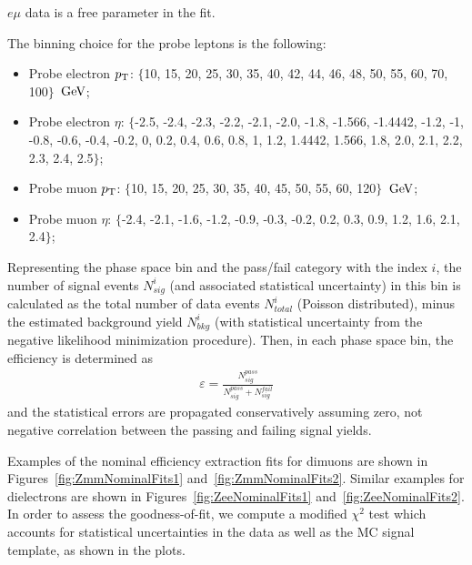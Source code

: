 {\ensuremath{e\mu} data is a free parameter in the fit.

The binning choice for the probe leptons is the following:
\begin{itemize}
\item Probe electron $p_{\mathrm{T}}$: $\{$10, 15, 20, 25, 30, 35, 40, 42, 44, 46, 48, 50, 55, 60, 70, 100$\}$ $\,\text{Ge\hspace{-.08em}V}$;
\item Probe electron $\eta$: $\{$-2.5, -2.4, -2.3, -2.2, -2.1, -2.0, -1.8, -1.566, -1.4442, -1.2, -1, -0.8, -0.6, -0.4, -0.2, 0, 0.2, 0.4, 0.6, 0.8, 1, 1.2, 1.4442, 1.566, 1.8, 2.0, 2.1, 2.2, 2.3, 2.4, 2.5$\}$;
\item Probe muon $p_{\mathrm{T}}$: $\{$10, 15, 20, 25, 30, 35, 40, 45, 50, 55, 60, 120$\}$ $\,\text{Ge\hspace{-.08em}V}$;
\item Probe muon $\eta$: $\{$-2.4, -2.1, -1.6, -1.2, -0.9, -0.3, -0.2, 0.2, 0.3, 0.9, 1.2, 1.6, 2.1, 2.4$\}$;
\end{itemize}

Representing the phase space bin and the pass/fail category with the index $i$,
the number of signal events $N_{sig}^{i}$ (and associated statistical uncertainty) in this bin
is calculated as the total number of data events $N_{total}^{i}$ (Poisson distributed),
minus the estimated background yield $N_{bkg}^{i}$
(with statistical uncertainty from the negative likelihood minimization procedure).
Then, in each phase space bin, the efficiency is determined as
\begin{align*}
  \varepsilon = \frac{N_{sig}^{pass}}{N_{sig}^{pass}+N_{sig}^{fail}}
\end{align*}
and the statistical errors are propagated conservatively assuming zero, not negative
correlation between the passing and failing signal yields.

Examples of the nominal efficiency extraction fits for dimuons are shown in Figures~\ref{fig:ZmmNominalFits1} and~\ref{fig:ZmmNominalFits2}.
Similar examples for dielectrons are shown in Figures~\ref{fig:ZeeNominalFits1} and~\ref{fig:ZeeNominalFits2}.
In order to assess the goodness-of-fit, we compute a modified $\chi^2$ test which accounts for
statistical uncertainties in the data as well as the MC signal template, as shown in the plots.

}
